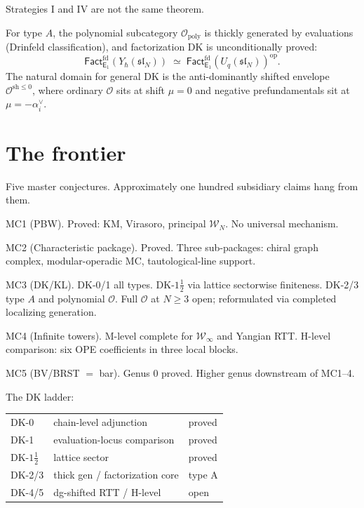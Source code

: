 \documentclass[11pt]{article}
\newcommand{\cO}{\mathcal{O}}
\newcommand{\cW}{\mathcal{W}}
\newcommand{\fsl}{\mathfrak{sl}}
\newcommand{\Eone}{\mathsf{E}_1}
\newcommand{\Fact}{\mathsf{Fact}}
\begin{document}
Strategies I and IV are not the same theorem.

For type $A$, the polynomial subcategory $\cO_{\mathrm{poly}}$ is
thickly generated by evaluations (Drinfeld classification), and
factorization DK is unconditionally proved:
\[
\Fact^{\mathrm{fd}}_{\Eone}(Y_\hbar(\fsl_N))
\;\simeq\;
\Fact^{\mathrm{fd}}_{\Eone}(U_q(\fsl_N))^{\mathrm{op}}.
\]
The natural domain for general DK is the anti-dominantly shifted
envelope $\cO^{\mathrm{sh}\leq 0}$, where ordinary $\cO$ sits at
shift $\mu = 0$ and negative prefundamentals sit at
$\mu = -\alpha_i^\vee$.


\section{The frontier}
\label{sec:frontier}

Five master conjectures.  Approximately one hundred subsidiary
claims hang from them.

\medskip
\textsc{MC1} (PBW).  Proved: KM, Virasoro, principal $\cW_N$.
No universal mechanism.

\textsc{MC2} (Characteristic package).  Proved.  Three
sub-packages: chiral graph complex, modular-operadic MC,
tautological-line support.

\textsc{MC3} (DK/KL).  DK-0/1 all types.
DK-$1\tfrac{1}{2}$ via lattice sectorwise finiteness.  DK-2/3
type $A$ and polynomial $\cO$.  Full $\cO$ at $N \geq 3$ open;
reformulated via completed localizing generation.

\textsc{MC4} (Infinite towers).  M-level complete for
$\cW_\infty$ and Yangian RTT.  H-level comparison: six OPE
coefficients in three local blocks.

\textsc{MC5} (BV/BRST $=$ bar).  Genus $0$ proved.  Higher genus
downstream of MC1--4.

\medskip

The DK ladder:
\begin{center}
\small
\begin{tabular}{lll}
DK-0 & chain-level adjunction & proved \\
DK-1 & evaluation-locus comparison & proved \\
DK-$1\frac{1}{2}$ & lattice sector & proved \\
DK-2/3 & thick gen / factorization core & type A \\
DK-4/5 & dg-shifted RTT / H-level & open
\end{tabular}
\end{center}
\end{document}

